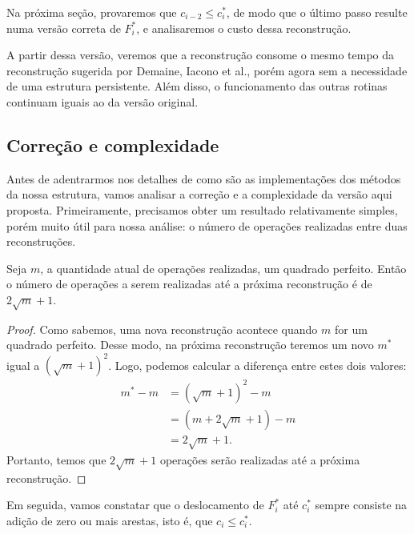Na próxima seção, provaremos que $c_{i-2} \leq c^*_i$, de modo que o último passo resulte numa versão correta de $F_i^*$, e analisaremos o custo dessa reconstrução.

A partir dessa versão, veremos que a reconstrução consome o mesmo tempo da reconstrução sugerida por Demaine, Iacono et al., porém agora sem a necessidade de uma estrutura persistente. Além disso, o funcionamento das outras rotinas continuam iguais ao da versão original.

\subsection{Correção e complexidade}
\label{sec:rmsf-complexidade}

Antes de adentrarmos nos detalhes de como são as implementações dos métodos da nossa estrutura, vamos analisar a correção e a complexidade da versão aqui proposta. Primeiramente, precisamos obter um resultado relativamente simples, porém muito útil para nossa análise: o número de operações realizadas entre duas reconstruções.

\begin{lemma}
    \label{coro:amt-op}
    Seja $m$, a quantidade atual de operações realizadas, um quadrado perfeito. Então o número de operações a serem realizadas até a próxima reconstrução é de $2 \sqrt{m} + 1$.
\end{lemma}
\begin{proof}
    Como sabemos, uma nova reconstrução acontece quando $m$ for um quadrado perfeito. Desse modo, na próxima reconstrução teremos um novo $m^*$ igual a $(\sqrt{m} + 1)^2$. Logo, podemos calcular a diferença entre estes dois valores:
    \begin{align*}
        m^* - m & = (\sqrt{m} + 1)^2 - m    \\
                & = (m + 2\sqrt{m} + 1) - m \\
                & = 2\sqrt{m} + 1.
    \end{align*}
    Portanto, temos que $2\sqrt{m} + 1$ operações serão realizadas até a próxima reconstrução.
\end{proof}

Em seguida, vamos constatar que o deslocamento de $F_i^*$ até $c_i^*$ sempre consiste na adição de zero ou mais arestas, isto é, que $c_i \leq c_i^*$.

